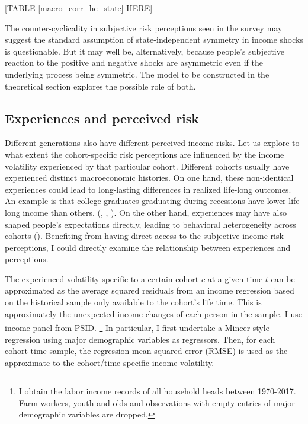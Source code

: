 \documentclass[12pt,notitlepage,onecolumn,aps,pra]{article}
\begin{document}
{[}TABLE \ref{macro_corr_he_state} HERE{]}

The counter-cyclicality in subjective risk perceptions seen in the
survey may suggest the standard assumption of state-independent symmetry
in income shocks is questionable. But it may well be, alternatively,
because people's subjective reaction to the positive and negative shocks
are asymmetric even if the underlying process being symmetric. The model
to be constructed in the theoretical section explores the possible role
of both.




    \hypertarget{experiences-and-perceived-risk}{%
\subsection{Experiences and perceived
risk}\label{experiences-and-perceived-risk}}

Different generations also have different perceived income risks. Let us
explore to what extent the cohort-specific risk perceptions are
influenced by the income volatility experienced by that particular
cohort. Different cohorts usually have experienced distinct
macroeconomic histories. On one hand, these non-identical experiences
could lead to long-lasting differences in realized life-long outcomes.
An example is that college graduates graduating during recessions have
lower life-long income than others. (\cite{kahn2010long},
\cite{oreopoulos2012short}, \cite{schwandt2019unlucky}). On the other
hand, experiences may have also shaped people's expectations directly,
leading to behavioral heterogeneity across cohorts
(\cite{malmendier2015learning}). Benefiting from having direct access to
the subjective income risk perceptions, I could directly examine the
relationship between experiences and perceptions.

The experienced volatility specific to a certain cohort \(c\) at a given
time \(t\) can be approximated as the average squared residuals from an
income regression based on the historical sample only available to the
cohort's life time. This is approximately the unexpected income changes
of each person in the sample. I use income panel from PSID.
\footnote{I obtain the labor income records of all household heads between 1970-2017. Farm workers, youth and olds and observations with empty entries of major demographic variables are dropped.}
In particular, I first undertake a Mincer-style regression using major
demographic variables as regressors. Then, for each cohort-time sample,
the regression mean-squared error (RMSE) is used as the approximate to
the cohort/time-specific income volatility.
\end{document}

